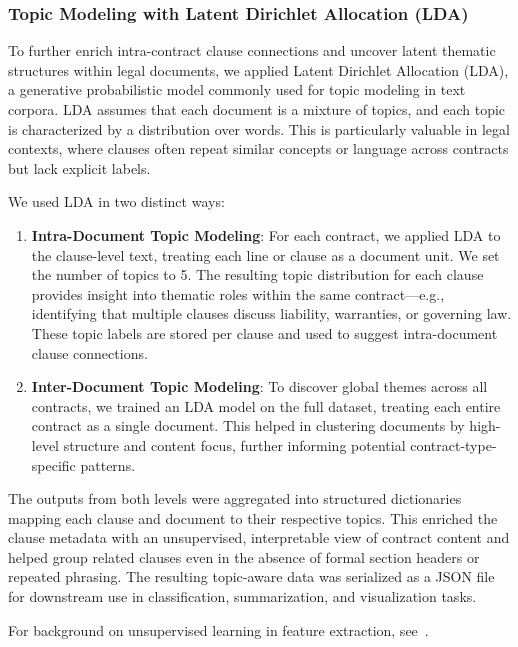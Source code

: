 \documentclass[11pt, oneside]{article}   	%
\begin{document}
\subsubsection*{Topic Modeling with Latent Dirichlet Allocation (LDA)}

To further enrich intra-contract clause connections and uncover latent thematic structures within legal documents, we applied Latent Dirichlet Allocation (LDA), a generative probabilistic model commonly used for topic modeling in text corpora. LDA assumes that each document is a mixture of topics, and each topic is characterized by a distribution over words. This is particularly valuable in legal contexts, where clauses often repeat similar concepts or language across contracts but lack explicit labels.

We used LDA in two distinct ways:

\begin{enumerate}
    \item \textbf{Intra-Document Topic Modeling}: For each contract, we applied LDA to the clause-level text, treating each line or clause as a document unit. We set the number of topics to 5. The resulting topic distribution for each clause provides insight into thematic roles within the same contract—e.g., identifying that multiple clauses discuss liability, warranties, or governing law. These topic labels are stored per clause and used to suggest intra-document clause connections.

    \item \textbf{Inter-Document Topic Modeling}: To discover global themes across all contracts, we trained an LDA model on the full dataset, treating each entire contract as a single document. This helped in clustering documents by high-level structure and content focus, further informing potential contract-type-specific patterns.
\end{enumerate}

The outputs from both levels were aggregated into structured dictionaries mapping each clause and document to their respective topics. This enriched the clause metadata with an unsupervised, interpretable view of contract content and helped group related clauses even in the absence of formal section headers or repeated phrasing. The resulting topic-aware data was serialized as a JSON file for downstream use in classification, summarization, and visualization tasks.

\vspace{0.5em}
\noindent For background on unsupervised learning in feature extraction, see~\cite{coates2011unsupervised}.
\end{document}
